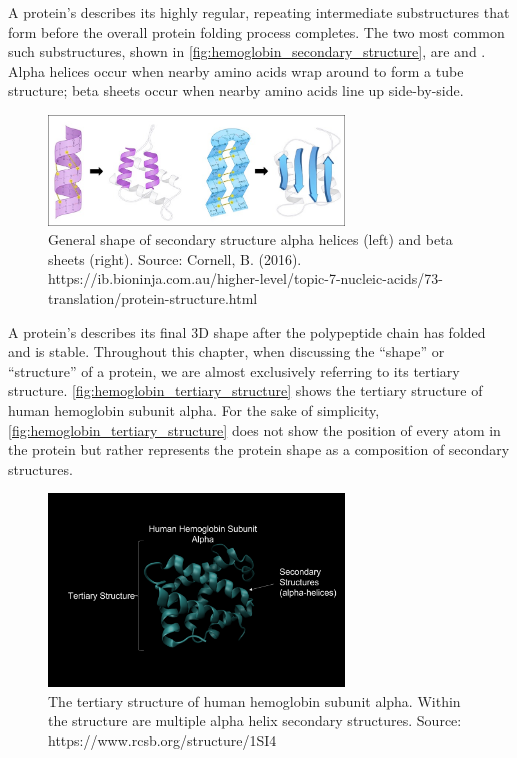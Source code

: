 A protein's  describes its highly regular, repeating intermediate substructures that form before the overall protein folding process completes. The two most common such substructures, shown in \autoref{fig:hemoglobin_secondary_structure}, are  and . Alpha helices occur when nearby amino acids wrap around to form a tube structure; beta sheets occur when nearby amino acids line up side-by-side.

\begin{figure}[h]
	\centering
	\mySfFamily
	\includegraphics[width = 0.7\textwidth]{../images/hemoglobin_secondary_structure.png}
	\caption{General shape of secondary structure alpha helices (left) and beta sheets (right). Source: Cornell, B. (2016). https://ib.bioninja.com.au/higher-level/topic-7-nucleic-acids/73-translation/protein-structure.html}
	\label{fig:hemoglobin_secondary_structure}
\end{figure}

A protein's  describes its final 3D shape after the polypeptide chain has folded and is stable. Throughout this chapter, when discussing the ``shape'' or ``structure'' of a protein, we are almost exclusively referring to its tertiary structure. \autoref{fig:hemoglobin_tertiary_structure} shows the tertiary structure of human hemoglobin subunit alpha. For the sake of simplicity, \autoref{fig:hemoglobin_tertiary_structure} does not show the position of every atom in the protein but rather represents the protein shape as a composition of secondary structures.

\begin{figure}[h]
	\centering
	\mySfFamily
	\includegraphics[width = 0.7\textwidth]{../images/hemoglobin_tertiary_structure.png}
	\caption{The tertiary structure of human hemoglobin subunit alpha. Within the structure are multiple alpha helix secondary structures. Source: https://www.rcsb.org/structure/1SI4}
	\label{fig:hemoglobin_tertiary_structure}
\end{figure}

